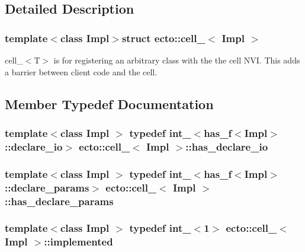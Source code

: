 \subsection{\-Detailed \-Description}
\subsubsection*{template$<$class Impl$>$struct ecto\-::cell\-\_\-$<$ Impl $>$}

cell\-\_\-$<$\-T$>$ is for registering an arbitrary class with the the cell \-N\-V\-I. \-This adds a barrier between client code and the cell. 

\subsection{\-Member \-Typedef \-Documentation}
\hypertarget{structecto_1_1cell___a10ab0d3f85e194d548beb3251416a569}{
\subsubsection[{has\-\_\-declare\-\_\-io}]{\setlength{\rightskip}{0pt plus 5cm}template$<$class Impl $>$ typedef {\bf int\-\_\-}$<${\bf has\-\_\-f}$<$\-Impl$>$\-::{\bf declare\-\_\-io}$>$ {\bf ecto\-::cell\-\_\-}$<$ \-Impl $>$\-::{\bf has\-\_\-declare\-\_\-io}}}\label{structecto_1_1cell___a10ab0d3f85e194d548beb3251416a569}
\hypertarget{structecto_1_1cell___ab7b111eb2672ae4eaacc668852b8b89f}{
\subsubsection[{has\-\_\-declare\-\_\-params}]{\setlength{\rightskip}{0pt plus 5cm}template$<$class Impl $>$ typedef {\bf int\-\_\-}$<${\bf has\-\_\-f}$<$\-Impl$>$\-::{\bf declare\-\_\-params}$>$ {\bf ecto\-::cell\-\_\-}$<$ \-Impl $>$\-::{\bf has\-\_\-declare\-\_\-params}}}\label{structecto_1_1cell___ab7b111eb2672ae4eaacc668852b8b89f}
\hypertarget{structecto_1_1cell___a63c5c3dd95630a508017730ee345c23a}{
\subsubsection[{implemented}]{\setlength{\rightskip}{0pt plus 5cm}template$<$class Impl $>$ typedef {\bf int\-\_\-}$<$1$>$ {\bf ecto\-::cell\-\_\-}$<$ \-Impl $>$\-::{\bf implemented}}}\label{structecto_1_1cell___a63c5c3dd95630a508017730ee345c23a}
